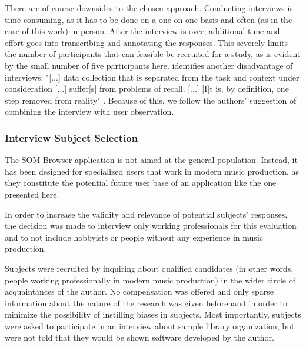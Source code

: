 \smallskip

There are of course downsides to the chosen approach. Conducting
interviews is time-consuming, as it has to be done on a one-on-one basis and
often (as in the case of this work) in person. After the interview is over,
additional time and effort goes into transcribing and annotating the responses.
This severely limits the number of participants that can feasible be recruited
for a study, as is evident by the small number of five participants here.
\citet{lazar2017} identifies another disadvantage of interviews: "[...] data
collection that is separated from the task and context under consideration [...]
suffer[s] from problems of recall. [...] [I]t is, by definition, one step
removed from reality" \citep[p.188ff.]{lazar2017}. Because of this, we follow
the authors' suggestion of combining the interview with user observation.

\subsubsection{Interview Subject Selection}
\label{subsubsec:subject_selection}
The SOM Browser application is not aimed at the general population. Instead, it
has been designed for specialized users that work in modern music production, as
they constitute the potential future user base of an application like the one
presented here.

\smallskip

In order to increase the validity and relevance of potential subjects'
responses, the decision was made to interview only working professionals for
this evaluation and to not include hobbyists or people without any experience in
music production.

\smallskip

Subjects were recruited by inquiring about qualified candidates (in other words,
people working professionally in modern music production) in the wider circle of
acquaintances of the author. No compensation was offered and only sparse
information about the nature of the research was given beforehand in order to
minimize the possibility of instilling biases in subjects. Most importantly,
subjects were asked to participate in an interview about sample library
organization, but were not told that they would be shown software developed by
the author.

